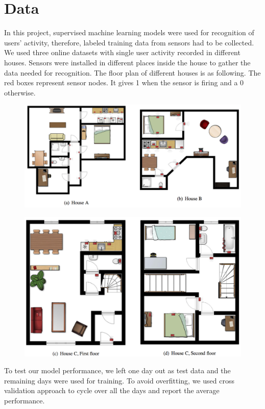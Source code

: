\documentclass[10pt,letter]{article}
\numberwithin{equation}{section} %
\numberwithin{figure}{section} %
\numberwithin{table}{section} %
\begin{document}
\section{Data}
In this project, supervised machine learning models were used for recognition of users' activity, therefore, labeled training data from sensors had to be collected. We used three online datasets with single user activity recorded in different houses. Sensors were installed in different places inside the house to gather the data needed for recognition. The floor plan of different houses is as following. The red boxes represent sensor nodes. It gives 1 when the sensor is firing and a 0 otherwise. 
\begin{figure}[h]
    \centering
    \includegraphics[width=16cm]{../plot/data1}
\end{figure}
\newpage
\begin{figure}[h]
    \centering
    \includegraphics[width=14cm]{../plot/data2}
\end{figure}
To test our model performance, we left one day out as test data and the remaining days were used for training. To avoid overfitting, we used cross validation approach to cycle over all the days and report the average performance. 
\end{document}
